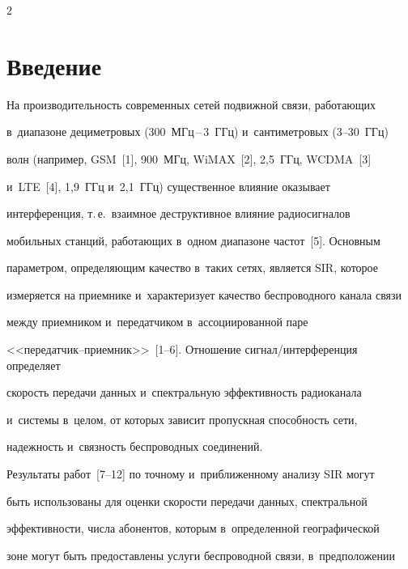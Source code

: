 \begin{multicols}{2}





\label{st\stat}





\section{Введение}





  На производительность современных сетей подвижной связи, работающих 


в~диапазоне де\-ци\-мет\-ро\-вых (300~МГц\,--\,3~ГГц) и~сантиметровых (3--30~ГГц) 


волн (например, GSM~[1], 900~МГц, WiMAX~[2], 2,5~ГГц, WCDMA~[3] 


и~LTE~[4], 1,9~ГГц и~2,1~ГГц) существенное влияние оказывает 


интерференция, т.\,е.\ взаимное деструктивное влияние радиосигналов 


мобильных станций, ра\-бо\-та\-ющих в~одном диапазоне частот~[5]. Основным 


па\-ра\-мет\-ром, определяющим качество в~таких сетях, является SIR, которое 


измеряется на приемнике и~характеризует качество беспроводного канала связи 


между приемником и~передатчиком в~ассоциированной паре  


<<пе\-ре\-дат\-чик--при\-ем\-ник>>~[1--6]. Отношение сиг\-нал/ин\-тер\-фе\-рен\-ция определяет 


скорость передачи данных и~спектральную эффективность радиоканала 


и~системы в~целом, от которых зависит пропускная способность сети, 


надежность и~связность беспроводных соединений. 


  


  Результаты работ~[7--12] по точному и~приближенному анализу SIR могут 


быть использованы для оценки скорости передачи данных, спектральной 


эффективности, числа абонентов, которым в~определенной географической 


зоне могут быть предоставлены услуги беспроводной связи, в~предположении 



\end{multicols}
